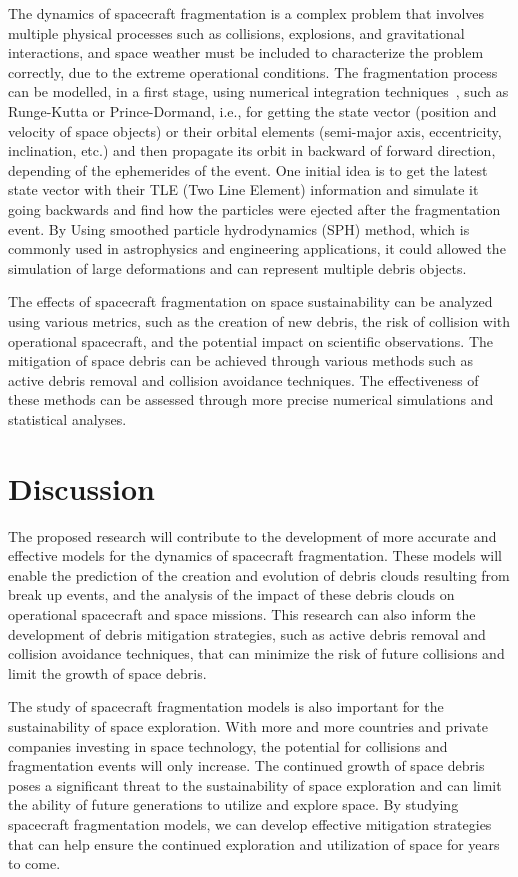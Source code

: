 \documentclass[11pt]{article} %
\begin{document}
The dynamics of spacecraft fragmentation is a complex problem that involves multiple physical processes such as collisions, explosions, and gravitational interactions, and space weather must be included to characterize the problem correctly, due to the extreme operational conditions. The fragmentation process can be modelled, in a first stage, using numerical integration techniques~\cite{frey2019extension}, such as Runge-Kutta or Prince-Dormand, i.e., for getting the state vector (position and velocity of space objects) or their orbital elements (semi-major axis, eccentricity, inclination, etc.) and then propagate its orbit in backward of forward direction, depending of the ephemerides of the event. One initial idea is to get the latest state vector with their TLE (Two Line Element) information and simulate it going  backwards and find how the particles were ejected after the fragmentation event. By Using smoothed particle hydrodynamics (SPH) method, which is commonly used in astrophysics and engineering applications, it could allowed the simulation of large deformations and can represent multiple debris objects. 

The effects of spacecraft fragmentation on space sustainability can be analyzed using various metrics, such as the creation of new debris, the risk of collision with operational spacecraft, and the potential impact on scientific observations. The mitigation of space debris can be achieved through various methods such as active debris removal and collision avoidance techniques. The effectiveness of these methods can be assessed through more precise numerical simulations and statistical analyses.

\section{Discussion}

The proposed research will contribute to the development of more accurate and effective models for the dynamics of spacecraft fragmentation. These models will enable the prediction of the creation and evolution of debris clouds resulting from break up events, and the analysis of the impact of these debris clouds on operational spacecraft and space missions. This research can also inform the development of debris mitigation strategies, such as active debris removal and collision avoidance techniques, that can minimize the risk of future collisions and limit the growth of space debris.

The study of spacecraft fragmentation models is also important for the sustainability of space exploration. With more and more countries and private companies investing in space technology, the potential for collisions and fragmentation events will only increase. The continued growth of space debris poses a significant threat to the sustainability of space exploration and can limit the ability of future generations to utilize and explore space. By studying spacecraft fragmentation models, we can develop effective mitigation strategies that can help ensure the continued exploration and utilization of space for years to come.
\end{document}
